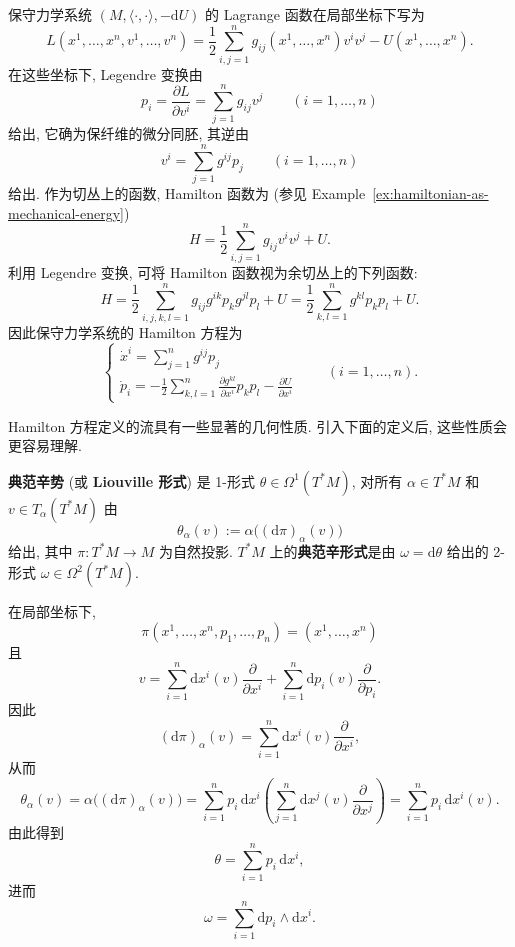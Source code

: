 \begin{RiemannExample}\label{ex:legendre-transform-for-conservative-system}
保守力学系统 $(M,\langle\cdot,\cdot\rangle,-\mathrm{d}U)$ 的 Lagrange 函数在局部坐标下写为
\[
  L(x^1,\ldots,x^n,v^1,\ldots,v^n)
  =\frac{1}{2}\sum_{i,j=1}^n g_{ij}(x^1,\ldots,x^n)v^iv^j
  -U(x^1,\ldots,x^n).
\]
在这些坐标下, Legendre 变换由
\[
  p_i=\frac{\partial L}{\partial v^i}=\sum_{j=1}^n g_{ij}v^j
  \qquad(i=1,\ldots,n)
\]
给出, 它确为保纤维的微分同胚, 其逆由
\[
  v^i=\sum_{j=1}^n g^{ij}p_j\qquad(i=1,\ldots,n)
\]
给出. 作为切丛上的函数, Hamilton 函数为 (参见 Example~\ref{ex:hamiltonian-as-mechanical-energy})
\[
  H=\frac{1}{2}\sum_{i,j=1}^n g_{ij}v^iv^j+U.
\]
利用 Legendre 变换, 可将 Hamilton 函数视为余切丛上的下列函数:
\[
  H=\frac{1}{2}\sum_{i,j,k,l=1}^n g_{ij}g^{ik}p_kg^{jl}p_l+U
    =\frac{1}{2}\sum_{k,l=1}^n g^{kl}p_kp_l+U.
\]
因此保守力学系统的 Hamilton 方程为
\[
  \begin{cases}
    \displaystyle\dot x^i=\sum_{j=1}^n g^{ij}p_j\\[.6ex]
    \displaystyle\dot p_i=-\frac12\sum_{k,l=1}^n
       \frac{\partial g^{kl}}{\partial x^i}p_kp_l-\frac{\partial U}{\partial x^i}
  \end{cases}
  \qquad(i=1,\ldots,n).
\]
\end{RiemannExample}

Hamilton 方程定义的流具有一些显著的几何性质. 引入下面的定义后, 这些性质会更容易理解.

\begin{RiemannDefinition}\label{def:canonical-symplectic-potential-and-form}
\textbf{典范辛势} (或 \textbf{Liouville 形式}) 是 1-形式 $\theta\in\Omega^1(T^*M)$, 对所有 $\alpha\in T^*M$ 和 $v\in T_\alpha(T^*M)$ 由
\[
  \theta_\alpha(v):=\alpha\bigl((\mathrm{d}\pi)_\alpha(v)\bigr)
\]
给出, 其中 $\pi:T^*M\to M$ 为自然投影. $T^*M$ 上的\textbf{典范辛形式}是由 $\omega=\mathrm{d}\theta$ 给出的 2-形式 $\omega\in\Omega^2(T^*M)$.
\end{RiemannDefinition}

在局部坐标下,
\[
  \pi(x^1,\ldots,x^n,p_1,\ldots,p_n)=(x^1,\ldots,x^n)
\]
且
\[
  v=\sum_{i=1}^n\mathrm{d}x^i(v)\frac{\partial}{\partial x^i}
  +\sum_{i=1}^n\mathrm{d}p_i(v)\frac{\partial}{\partial p_i}.
\]
因此
\[
  (\mathrm{d}\pi)_\alpha(v)
  =\sum_{i=1}^n\mathrm{d}x^i(v)\frac{\partial}{\partial x^i},
\]
从而
\[
  \theta_\alpha(v)=\alpha\bigl((\mathrm{d}\pi)_\alpha(v)\bigr)
  =\sum_{i=1}^n p_i\,\mathrm{d}x^i\left(
     \sum_{j=1}^n\mathrm{d}x^j(v)\frac{\partial}{\partial x^j}\right)
  =\sum_{i=1}^n p_i\,\mathrm{d}x^i(v).
\]
由此得到
\[
  \theta=\sum_{i=1}^n p_i\,\mathrm{d}x^i,
\]
进而
\[
  \omega=\sum_{i=1}^n\mathrm{d}p_i\wedge\mathrm{d}x^i.
\]

